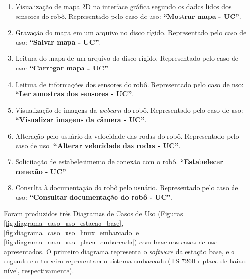 \begin{enumerate}[topsep=0pt, partopsep=0pt, itemsep=0pt]
  \item Visualização de mapa 2D na interface gráfica segundo os dados lidos dos sensores do robô. Representado pelo caso de uso: \textbf{``Mostrar mapa - UC''}.
  \item Gravação do mapa em um arquivo no disco rígido. Representado pelo caso de uso: \textbf{``Salvar mapa - UC''}. 
  \item Leitura do mapa de um arquivo do disco rígido. Representado pelo caso de uso: \textbf{``Carregar mapa - UC''}.
  \item Leitura de informações dos sensores do robô. Representado pelo caso de uso: \textbf{``Ler amostras dos sensores - UC''}.
  \item Visualização de imagens da \textit{webcam} do robô. Representado pelo caso de uso: \textbf{``Visualizar imagens da câmera - UC''}.
  \item Alteração pelo usuário da velocidade das rodas do robô. Representado pelo caso de uso: \textbf{``Alterar velocidade das rodas - UC''}.
  \item Solicitação de estabelecimento de conexão com o robô. \textbf{``Estabelecer conexão - UC''}.
  \item Consulta à documentação do robô pelo usuário. Representado pelo caso de uso: \textbf{``Consultar documentação do robô - UC''}.
\end{enumerate}

Foram produzidos três Diagramas de Casos de Uso (Figuras \ref{fig:diagrama_caso_uso_estacao_base}, \ref{fig:diagrama_caso_uso_linux_embarcado} e \ref{fig:diagrama_caso_uso_placa_embarcada}) com base nos casos de uso apresentados. O primeiro diagrama representa o \textit{software} da estação base, e o segundo e o terceiro representam o sistema embarcado (TS-7260 e placa de baixo nível, respectivamente).

